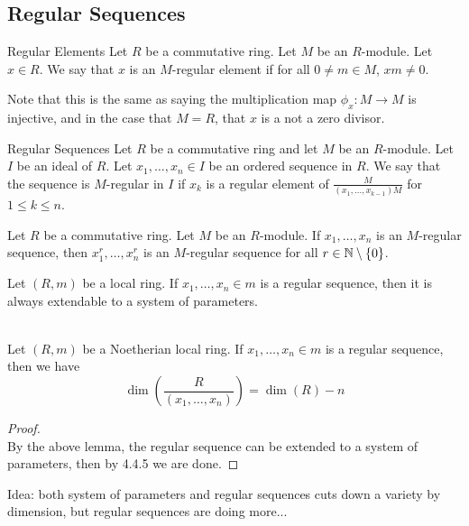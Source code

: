 \documentclass[a4paper]{article}
\begin{document}
\subsection{Regular Sequences}
\begin{defn}{Regular Elements}{} Let $R$ be a commutative ring. Let $M$ be an $R$-module. Let $x\in R$. We say that $x$ is an $M$-regular element if for all $0\neq m\in M$, $xm\neq 0$. 
\end{defn}

Note that this is the same as saying the multiplication map $\phi_x:M\to M$ is injective, and in the case that $M=R$, that $x$ is a not a zero divisor. 

\begin{defn}{Regular Sequences}{} Let $R$ be a commutative ring and let $M$ be an $R$-module. Let $I$ be an ideal of $R$. Let $x_1,\dots,x_n\in I$ be an ordered sequence in $R$. We say that the sequence is $M$-regular in $I$ if $x_k$ is a regular element of $\frac{M}{(x_1,\dots,x_{k-1})M}$ for $1\leq k\leq n$. 
\end{defn}

\begin{lmm}{}{} Let $R$ be a commutative ring. Let $M$ be an $R$-module. If $x_1,\dots,x_n$ is an $M$-regular sequence, then $x_1^r,\dots,x_n^r$ is an $M$-regular sequence for all $r\in\mathbb{N}\setminus\{0\}$. 
\end{lmm}

\begin{lmm}{}{} Let $(R,m)$ be a local ring. If $x_1,\dots,x_n\in m$ is a regular sequence, then it is always extendable to a system of parameters. 
\end{lmm}

\begin{crl}{}{}\\
Let $(R,m)$ be a Noetherian local ring. If $x_1,\dots,x_n\in m$ is a regular sequence, then we have $$\dim\left(\frac{R}{(x_1,\dots,x_n)}\right)=\dim(R)-n$$
\begin{proof}\\
By the above lemma, the regular sequence can be extended to a system of parameters, then by 4.4.5 we are done. 
\end{proof}
\end{crl}

Idea: both system of parameters and regular sequences cuts down a variety by dimension, but regular sequences are doing more...

\end{document}
